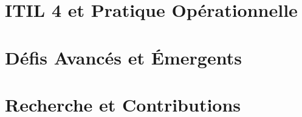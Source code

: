 \documentclass[12pt, twoside, openright, a4paper]{book}
\begin{document}
    \part{ITIL 4 et Pratique Opérationnelle}
    \label{part:pratique}

        
        
        
        
        
        

    \part{Défis Avancés et Émergents}
    \label{part:avance}

        
        

    \part{Recherche et Contributions}
    \label{part:recherche}

        
        

\appendix
\end{document}
